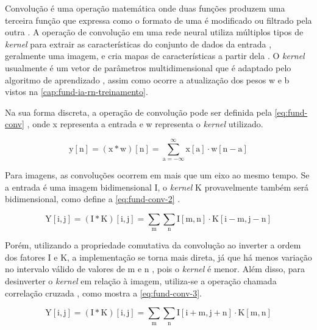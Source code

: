 
Convolução é uma operação matemática onde duas funções produzem uma terceira função que expressa como o formato de uma é modificado ou filtrado pela outra \cite{ref:Yan}. A operação de convolução em uma rede neural utiliza múltiplos tipos de \textit{kernel} para extrair as características do conjunto de dados da entrada \cite{ref:Eden-Ierapetritou-Towler}, geralmente uma imagem, e cria mapas de características a partir dela \cite{ref:Gholamalinezhad-Khosravi}. O \textit{kernel} usualmente é um vetor de parâmetros multidimensional que é adaptado pelo algoritmo de aprendizado \cite{ref:Goodfellow-Bengio-Courville}, assim como ocorre a atualização dos pesos w e b vistos na \autoref{cap:fund-ia-rn-treinamento}.

Na sua forma discreta, a operação de convolução pode ser definida pela \autoref{eq:fund-conv} \cite{ref:Goodfellow-Bengio-Courville}, onde x representa a entrada e w representa o \textit{kernel} utilizado.

\begin{equation} \label{eq:fund-conv}
\mathrm{
  y[n] = (x \ast w)[n] = \sum_{a = -\infty}^{\infty} x[a] \cdot w [n - a]
}
\end{equation}

Para imagens, as convoluções ocorrem em mais que um eixo ao mesmo tempo. Se a entrada é uma imagem bidimensional I, o \textit{kernel} K provavelmente também será bidimensional, como define a \autoref{eq:fund-conv-2} \cite{ref:Goodfellow-Bengio-Courville}.

\begin{equation} \label{eq:fund-conv-2}
\mathrm{
  Y[i, j] = (I \ast K)[i, j] = \sum_{m} \sum_{n} I[m,n] \cdot K [i-m, j-n]
}
\end{equation}

Porém, utilizando a propriedade comutativa da convolução ao inverter a ordem dos fatores I e K, a implementação se torna mais direta, já que há menos variação no intervalo válido de valores de m e n \cite{ref:Goodfellow-Bengio-Courville}, pois o \textit{kernel} é menor. Além disso, para desinverter o \textit{kernel} em relação à imagem, utiliza-se a operação chamada correlação cruzada \cite{ref:Goodfellow-Bengio-Courville}, como mostra a \autoref{eq:fund-conv-3}.

\begin{equation} \label{eq:fund-conv-3}
\mathrm{
 Y[i, j] = (I \ast K)[i, j] = \sum_{m} \sum_{n} I[i + m,j + n] \cdot K [m,n]
}
\end{equation}

